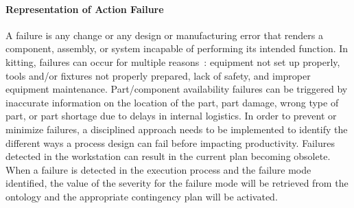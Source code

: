 \paragraph{Representation of Action Failure}\label{sss:failure}
 A failure is any change or any design or manufacturing error that renders a
component, assembly, or system incapable of performing its intended function.
In kitting, failures can occur for multiple reasons~\cite{Leger.1999,Kaiser.2007}: equipment not set up properly,
tools and/or fixtures not properly prepared, lack of safety, and improper equipment
maintenance. Part/component availability failures can be triggered by inaccurate information
on the location of the part, part damage, wrong type of part, or part shortage due to delays
in internal logistics. In order to prevent or minimize failures, a disciplined approach
needs to be implemented to identify the different ways a process design can fail before
impacting productivity. Failures detected in the workstation can result in the current
plan becoming obsolete. When a failure is detected in the execution process and the failure
mode identified, the value of the severity for the failure mode will be retrieved from the
ontology and the appropriate contingency plan will be activated.
